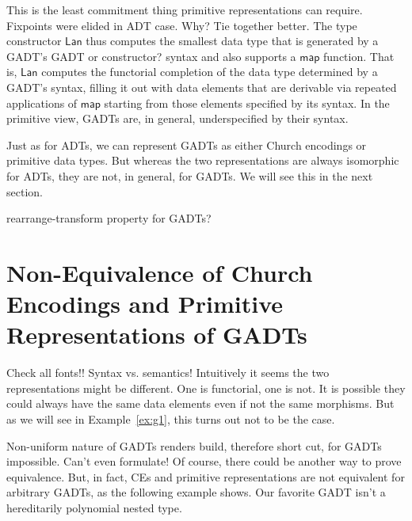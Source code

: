 \documentclass[acmsmall,screen,review,anonymous]{acmart}
\theoremstyle{definition}
\begin{document}
{\color{blue} This is the least commitment
  thing primitive representations can require. Fixpoints were elided
  in ADT case. Why? Tie together better.}  The type constructor
$\mathsf{Lan}$ thus computes the smallest data type that is generated
by a GADT's {\color{blue} GADT or constructor?} syntax and also
supports a $\mathsf{map}$ function. That is, $\mathsf{Lan}$ computes
the functorial completion of the data type determined by a GADT's
syntax, filling it out with data elements that are derivable via
repeated applications of $\mathsf{map}$ starting from those elements
specified by its syntax. In the primitive view, GADTs are, in general,
underspecified by their syntax.

Just as for ADTs, we can represent GADTs as either Church encodings or
primitive data types. But whereas the two representations are always
isomorphic for ADTs, they are not, in general, for GADTs. We will see
this in the next section.

{\color{blue} rearrange-transform property for GADTs?}

\section{Non-Equivalence of Church Encodings and Primitive
  Representations of GADTs}\label{sec:non-equiv}

{\color{red} Check all fonts!! Syntax vs. semantics!}  Intuitively it
seems the two representations might be different. One is functorial,
one is not. It is possible they could always have the same data
elements even if not the same morphisms. But as we will see in
Example~\ref{ex:g1}, this turns out not to be the case.

Non-uniform nature of GADTs renders build, therefore short cut, for
GADTs impossible. Can't even formulate! Of course, there could be
another way to prove equivalence.  But, in fact, CEs and primitive
representations are not equivalent for arbitrary GADTs, as the
following example shows.
{\color{blue} Our favorite GADT isn't a hereditarily
  polynomial nested type.}
\end{document}
